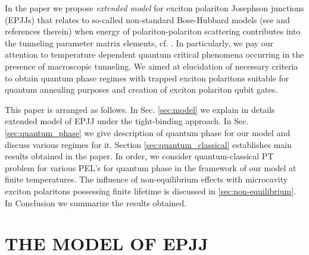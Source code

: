 \documentclass[aps, pre, preprint, groupedaddress, superscriptaddress, showkeys, showpacs] {revtex4-1}
\begin{document}
In the paper we propose \textit{extended model} for exciton polariton Josephson junctions (EPJJs) that relates to so-called non-standard Bose-Hubbard models (see \cite{Dutta} and references therein) when energy of polariton-polariton scattering contributes into the tunneling parameter matrix elements, cf. \cite{Aleiner, Shelykh_2008, Borgh_2010, Solnyshkov_2008, Sarchi}.
In particularly, we pay our attention to temperature dependent quantum critical phenomena occurring in the presence of macroscopic tunneling.
We aimed at elucidation of necessary criteria to obtain quantum phase regimes with trapped exciton polaritons suitable for quantum annealing purposes and creation of exciton polariton qubit gates.

This paper is arranged as follows.
In Sec. \ref{sec:model} we explain in details  extended model of EPJJ under the tight-binding approach. 
In Sec. \ref{sec:quantum_phase} we give description of quantum phase for our model and discuss various regimes for it. Section \ref{sec:quantum_classical} establishes main results obtained in the paper. In order, we consider quantum-classical PT problem for various PEL's for quantum phase in the framework of our model at finite temperatures.  The influence of non-equilibrium effects with microcavity exciton polaritons possessing finite lifetime is discussed in \ref{sec:non-equilibrium}.      
In Conclusion we summarize the results obtained.

\section{THE MODEL OF EPJJ \label{sec:model}}
\end{document}
